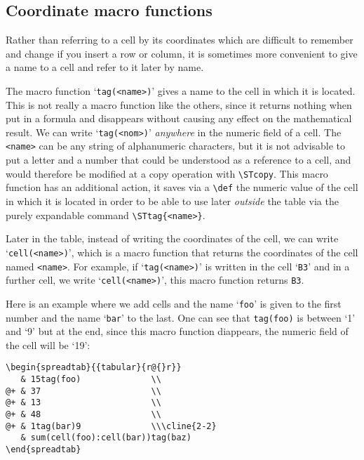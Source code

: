 \documentclass[a4paper,10pt]{article}
\newcommand\verbinline[1][]{\lstinline[breaklines=false,basicstyle=\normalsize\ttfamily,#1]}
\begin{document}
\begin{<table environment>}
\subsection{Coordinate macro functions}\label{tag}
Rather than referring to a cell by its coordinates which are difficult to remember and change if you insert a row or column, it is sometimes more convenient to give a name to a cell and refer to it later by name.

The macro function `\verbinline-tag(<name>)-' gives a name to the cell in which it is located. This is not really a macro function like the others, since it returns nothing when put in a formula and disappears without causing any effect on the mathematical result. We can write `\verbinline-tag(<nom>)-' \emph{anywhere} in the numeric field of a cell. The \verb-<name>- can be any string of alphanumeric characters, but it is not advisable to put a letter and a number that could be understood as a reference to a cell, and would therefore be modified at a copy operation with \verbinline-\STcopy-. This macro function has an additional action, it saves via a \verbinline-\def- the numeric value of the cell in which it is located in order to be able to use later \emph{outside} the table via the purely expandable command \verbinline-\STtag{<name>}-.

Later in the table, instead of writing the coordinates of the cell, we can write `\verbinline-cell(<name>)-', which is a macro function that returns the coordinates of the cell named \verb-<name>-. For example, if `\verbinline-tag(<name>)-' is written in the cell `\verb-B3-' and in a further cell, we write `\verbinline-cell(<name>)-', this macro function returns \verb-B3-.

Here is an example where we add cells and the name `\verb-foo-' is given to the first number and the name `\verb-bar-' to the last. One can see that \verbinline-tag(foo)- is between `1' and `9' but at the end, since this macro function diappears, the numeric field of the cell will be `19':
\begin{lstlisting}
\begin{spreadtab}{{tabular}{r@{}r}}
   & 15tag(foo)              \\
@+ & 37                      \\
@+ & 13                      \\
@+ & 48                      \\
@+ & 1tag(bar)9              \\\cline{2-2}
   & sum(cell(foo):cell(bar))tag(baz)
\end{spreadtab}


\end{lstlisting}
\end{<table environment>}
\end{document}
